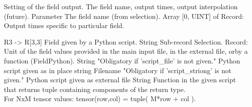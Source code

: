 \begin{RecordType}
	{}
	{} %
	{} %
	{} %
	{{{Setting of the field output. The field name, output times, output interpolation (future).}}}
		\KeyItem
			{}
			{{Parameter}}
			{\textrangle}
			{} %
			{{{The field name (from selection).}}}
		\KeyItem
			{}
			{{Array [0, UINT] of }{Record}{: }}
			{\textrangle}
			{} %
			{{{Output times specific to particular field.}}}
\end{RecordType}
\begin{RecordType}
	{}
	{} %
	{} %
	{} %
	{{{R3 -{\textgreater} R[3,3] Field given by a Python script.}}}
		\KeyItem
			{}
			{{String}}
			{\textrangle}
			{} %
			{{{Sub-record Selection.}}}
		\KeyItem
			{}
			{{Record}{: }}
			{\textrangle}
			{} %
			{{{Unit of the field values provided in the main input file, in the external file, orby a function (FieldPython).}}}
		\KeyItem
			{}
			{{String}}
			{"{Obligatory if 'script{\_}file' is not given.}"}
			{} %
			{{{Python script given as in place string}}}
		\KeyItem
			{}
			{{Filename}}
			{"{Obligatory if 'script{\_}striong' is not given.}"}
			{} %
			{{{Python script given as external file}}}
		\KeyItem
			{}
			{{String}}
			{\textrangle}
			{} %
			{{{Function in the given script that returns tuple containing components of the return type.}\\{
For NxM tensor values: tensor(row,col) = tuple( M*row + col ).}}}
\end{RecordType}
